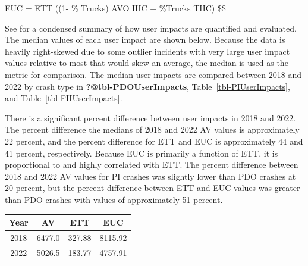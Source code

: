 \documentclass[
  letterpaper,
  authoryear]{elsarticle}
\begin{document}
EUC = ETT \times ((1- \% Trucks) \times AVO \times IHC + \%Trucks
\times THC) \$\$

See \citet{schultz_analysis_2023} for a condensed summary of how user
impacts are quantified and evaluated. The median values of each user
impact are shown below. Because the data is heavily right-skewed due to
some outlier incidents with very large user impact values relative to
most that would skew an average, the median is used as the metric for
comparison. The median user impacts are compared between 2018 and 2022
by crash type in \textbf{?@tbl-PDOUserImpacts},
Table~\ref{tbl-PIUserImpacts}, and Table~\ref{tbl-FIIUserImpacts}.

There is a significant percent difference between user impacts in 2018
and 2022. The percent difference the medians of 2018 and 2022 AV values
is approximately 22 percent, and the percent difference for ETT and EUC
is approximately 44 and 41 percent, respectively. Because EUC is
primarily a function of ETT, it is proportional to and highly correlated
with ETT. The percent difference between 2018 and 2022 AV values for PI
crashes was slightly lower than PDO crashes at 20 percent, but the
percent difference between ETT and EUC values was greater than PDO
crashes with values of approximately 51 percent.

\begin{table}
\centering
\begin{tabular}[t]{c|c|c|c}
\hline
Year & AV & ETT & EUC\\
\hline
2018 & 6477.0 & 327.88 & 8115.92\\
\hline
2022 & 5026.5 & 183.77 & 4757.91\\
\hline
\end{tabular}
\end{table}

\begin{table}

\caption{\label{tbl-PIUserImpacts}Median User Impacts of PI Crashes}


\end{table}%
\end{document}
